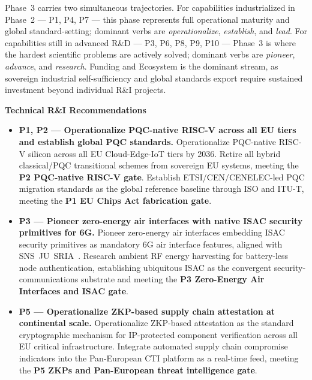 Phase~3 carries two simultaneous trajectories. For capabilities
industrialized in Phase~2 --- P1, P4, P7 --- this phase represents full
operational maturity and global standard-setting; dominant verbs are
\emph{operationalize}, \emph{establish}, and \emph{lead}. For capabilities
still in advanced R\&D --- P3, P6, P8, P9, P10 --- Phase~3 is where the
hardest scientific problems are actively solved; dominant verbs are
\emph{pioneer}, \emph{advance}, and \emph{research}. Funding and Ecosystem
is the dominant stream, as sovereign industrial self-sufficiency and global
standards export require sustained investment beyond individual R\&I
projects.

\textbf{Technical R\&I Recommendations}

\begin{itemize}

    \item \textbf{P1, P2 --- Operationalize PQC-native RISC-V across
    all EU tiers and establish global PQC standards.}
    Operationalize PQC-native RISC-V silicon across all EU
    Cloud-Edge-IoT tiers by 2036. Retire all hybrid classical/PQC
    transitional schemes from sovereign EU systems, meeting the
    \textbf{P2 PQC-native RISC-V gate}. Establish
    ETSI/CEN/CENELEC-led PQC migration standards as the global
    reference baseline through ISO and ITU-T, meeting the
    \textbf{P1 EU Chips Act fabrication gate}.

    \item \textbf{P3 --- Pioneer zero-energy air interfaces with
    native ISAC security primitives for 6G.}
    Pioneer zero-energy air interfaces embedding ISAC security
    primitives as mandatory 6G air interface features, aligned with
    SNS~JU~SRIA~\cite{snsju}. Research ambient RF energy harvesting
    for battery-less node authentication, establishing ubiquitous
    ISAC as the convergent security-communications substrate and
    meeting the \textbf{P3 Zero-Energy Air Interfaces and ISAC gate}.

    \item \textbf{P5 --- Operationalize ZKP-based supply chain
    attestation at continental scale.}
    Operationalize ZKP-based attestation as the standard cryptographic
    mechanism for IP-protected component verification across all EU
    critical infrastructure. Integrate automated supply chain
    compromise indicators into the Pan-European CTI platform as a
    real-time feed, meeting the \textbf{P5 ZKPs and Pan-European
    threat intelligence gate}.


\end{itemize}
